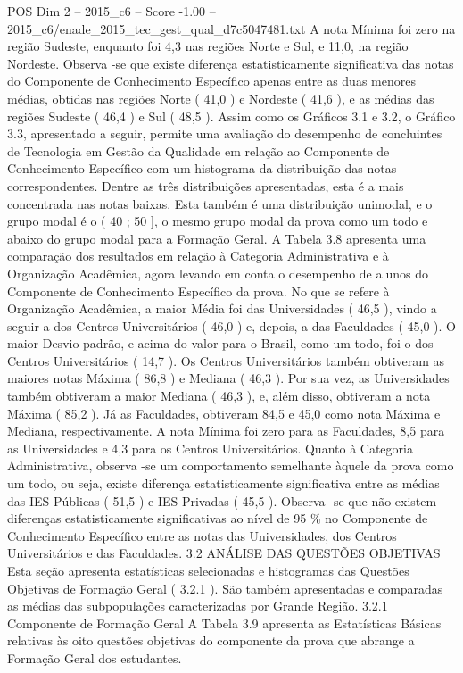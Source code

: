 \begin{textsample}{POS Dim 2 – 2015\_c6 – Score -1.00 – 2015\_c6/enade\_2015\_tec\_gest\_qual\_d7c5047481.txt}
A nota Mínima foi zero na região Sudeste, enquanto foi 4,3 nas regiões Norte e Sul, e 11,0, na região Nordeste.
Observa -se que existe diferença estatisticamente significativa das notas do Componente de Conhecimento Específico apenas entre as duas menores médias, obtidas nas regiões Norte ( 41,0 ) e Nordeste ( 41,6 ), e as médias das regiões Sudeste ( 46,4 ) e Sul ( 48,5 ).
Assim como os Gráficos 3.1 e 3.2, o Gráfico 3.3, apresentado a seguir, permite uma avaliação do desempenho de concluintes de Tecnologia em Gestão da Qualidade em relação ao Componente de Conhecimento Específico com um histograma da distribuição das notas correspondentes.
Dentre as três distribuições apresentadas, esta é a mais concentrada nas notas baixas.
Esta também é uma distribuição unimodal, e o grupo modal é o ( 40 ; 50 ], o mesmo grupo modal da prova como um todo e abaixo do grupo modal para a Formação Geral.
A Tabela 3.8 apresenta uma comparação dos resultados em relação à Categoria Administrativa e à Organização Acadêmica, agora levando em conta o desempenho de alunos do Componente de Conhecimento Específico da prova.
No que se refere à Organização Acadêmica, a maior Média foi das Universidades ( 46,5 ), vindo a seguir a dos Centros Universitários ( 46,0 ) e, depois, a das Faculdades ( 45,0 ).
O maior Desvio padrão, e acima do valor para o Brasil, como um todo, foi o dos Centros Universitários ( 14,7 ).
Os Centros Universitários também obtiveram as maiores notas Máxima ( 86,8 ) e Mediana ( 46,3 ).
Por sua vez, as Universidades também obtiveram a maior Mediana ( 46,3 ), e, além disso, obtiveram a nota Máxima ( 85,2 ).
Já as Faculdades, obtiveram 84,5 e 45,0 como nota Máxima e Mediana, respectivamente.
A nota Mínima foi zero para as Faculdades, 8,5 para as Universidades e 4,3 para os Centros Universitários.
Quanto à Categoria Administrativa, observa -se um comportamento semelhante àquele da prova como um todo, ou seja, existe diferença estatisticamente significativa entre as médias das IES Públicas ( 51,5 ) e IES Privadas ( 45,5 ).
Observa -se que não existem diferenças estatisticamente significativas ao nível de 95 \% no Componente de Conhecimento Específico entre as notas das Universidades, dos Centros Universitários e das Faculdades. 3.2 ANÁLISE DAS QUESTÕES OBJETIVAS Esta seção apresenta estatísticas selecionadas e histogramas das Questões Objetivas de Formação Geral ( 3.2.1 ).
São também apresentadas e comparadas as médias das subpopulações caracterizadas por Grande Região. 3.2.1 Componente de Formação Geral A Tabela 3.9 apresenta as Estatísticas Básicas relativas às oito questões objetivas do componente da prova que abrange a Formação Geral dos estudantes.

\end{textsample}
